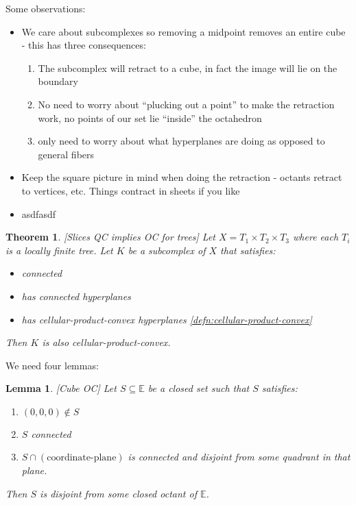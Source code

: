 \documentclass{article}
\theoremstyle{mystyle}
\newtheorem{thm}{Theorem}[section]
\newtheorem{lem}{Lemma}[section]
\theoremstyle{remark}
\begin{document}
Some observations:
\begin{itemize}
	\item We care about subcomplexes so removing a midpoint removes an entire cube - this has three consequences:
		\begin{enumerate}
			\item The subcomplex will retract to a cube, in fact the image will lie on the boundary
			\item No need to worry about ``plucking out a point'' to make the retraction work, no points of our set lie ``inside'' the octahedron
			\item only need to worry about what hyperplanes are doing as opposed to general fibers
		\end{enumerate}
	\item Keep the square picture in mind when doing the retraction - octants retract to vertices, etc. Things contract in sheets if you like
	\item asdfasdf
\end{itemize}

\begin{thm}
	\label{thm:QCOC}
    [Slices QC implies OC for trees]
	Let \(X=T_{1} \times T_{2} \times T_{3}\) where each \(T_{i}\) is a locally finite tree. Let \(K\) be a subcomplex of \(X\) that satisfies: 
	\begin{itemize}
		\item connected
		\item has connected hyperplanes
		\item has cellular-product-convex hyperplanes \ref{defn:cellular-product-convex}
	\end{itemize}
Then \(K\) is also cellular-product-convex.
\end{thm}
We need four lemmas:

\begin{lem}
	\label{lem:cubeOC}
	[Cube OC] Let \(S \subseteq \mathbb{E}  \) be a closed set such that \(S\) satisfies: 
	\begin{enumerate}
		\item \((0,0,0) \not\in S\) 
		\item \(S\) connected
		\item \(S \cap (\text{coordinate-plane})\) is connected and disjoint from some quadrant in that plane.
	\end{enumerate}
	Then \(S\) is disjoint from some closed octant of \(\mathbb{E}\). 
\end{lem}
\end{document}
